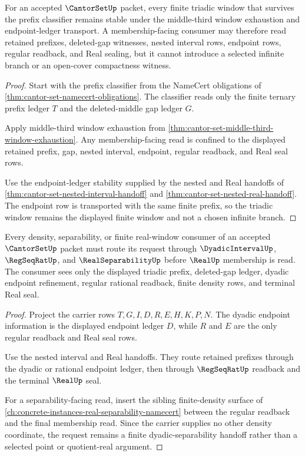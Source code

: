 \begin{theorem}
\label{thm:cantor-set-triadic-window-stability}
For an accepted $\CantorSetUp$ packet, every finite triadic window that survives the prefix classifier remains stable under the middle-third window exhaustion and endpoint-ledger transport. A membership-facing consumer may therefore read retained prefixes, deleted-gap witnesses, nested interval rows, endpoint rows, regular readback, and Real sealing, but it cannot introduce a selected infinite branch or an open-cover compactness witness.
\end{theorem}
\begin{proof}
Start with the prefix classifier from the NameCert obligations of \autoref{thm:cantor-set-namecert-obligations}. The classifier reads only the finite ternary prefix ledger $T$ and the deleted-middle gap ledger $G$.

Apply middle-third window exhaustion from \autoref{thm:cantor-set-middle-third-window-exhaustion}. Any membership-facing read is confined to the displayed retained prefix, gap, nested interval, endpoint, regular readback, and Real seal rows.

Use the endpoint-ledger stability supplied by the nested and Real handoffs of \autoref{thm:cantor-set-nested-interval-handoff} and \autoref{thm:cantor-set-nested-real-handoff}. The endpoint row is transported with the same finite prefix, so the triadic window remains the displayed finite window and not a chosen infinite branch.
\end{proof}

\begin{theorem}
\label{thm:cantor-set-dyadic-separability-handoff}
Every density, separability, or finite real-window consumer of an accepted $\CantorSetUp$ packet must route its request through $\DyadicIntervalUp$, $\RegSeqRatUp$, and $\RealSeparabilityUp$ before $\RealUp$ membership is read. The consumer sees only the displayed triadic prefix, deleted-gap ledger, dyadic endpoint refinement, regular rational readback, finite density rows, and terminal Real seal.
\end{theorem}
\begin{proof}
Project the carrier rows $T,G,I,D,R,E,H,K,P,N$. The dyadic endpoint information is the displayed endpoint ledger $D$, while $R$ and $E$ are the only regular readback and Real seal rows.

Use the nested interval and Real handoffs. They route retained prefixes through the dyadic or rational endpoint ledger, then through $\RegSeqRatUp$ readback and the terminal $\RealUp$ seal.

For a separability-facing read, insert the sibling finite-density surface of \autoref{ch:concrete-instances-real-separability-namecert} between the regular readback and the final membership read. Since the carrier supplies no other density coordinate, the request remains a finite dyadic-separability handoff rather than a selected point or quotient-real argument.
\end{proof}

